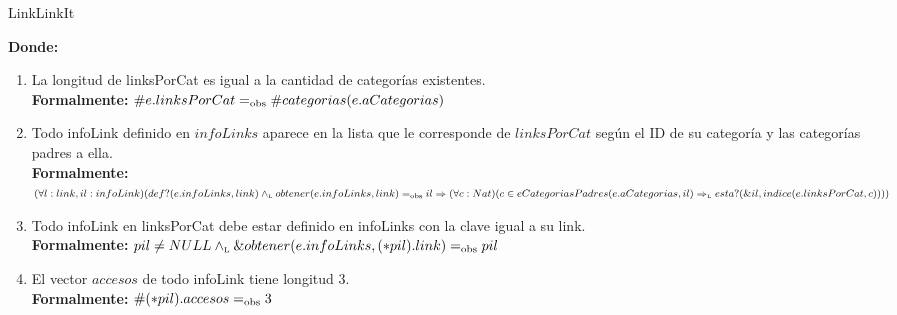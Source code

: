 \documentclass[10pt, a4paper]{article}
\begin{document}
\begin{Estructura}{LinkLinkIt}
    \begin{Tupla}
    \end{Tupla}

	\begin{Tupla}[infoLink]
	\end{Tupla}
\end{Estructura}

\mbox{}

{\bf Donde:}

\begin{enumerate}
  \item La longitud de linksPorCat es igual a la cantidad de categor\'ias existentes.\\
		{\bf Formalmente:} $\#e.linksPorCat =_{\mathrm{obs}} \#categorias(e.aCategorias)$

  \item Todo infoLink definido en $infoLinks$ aparece en la lista que le corresponde de $linksPorCat$ seg\'un el ID de su categor\'ia y las categor\'ias padres a ella.\\
		{\bf Formalmente:} $(\forall l:link, il:infoLink)(def?(e.infoLinks, link) \land_{\mathrm{\scriptscriptstyle{L}}} obtener(e.infoLinks, link) =_{\mathrm{obs}} il \Rightarrow (\forall c:Nat)(c \in eCategoriasPadres(e.aCategorias, il) \Rightarrow_{\mathrm{\scriptscriptstyle{L}}} esta?(\&il, indice(e.linksPorCat, c))))$

  \item Todo infoLink en linksPorCat debe estar definido en infoLinks con la clave igual a su link.\\
		{\bf Formalmente:} $pil \neq NULL \land_{\mathrm{\scriptscriptstyle{L}}} \&obtener(e.infoLinks, (*pil).link) =_{\mathrm{obs}} pil$

  \item El vector $accesos$ de todo infoLink tiene longitud 3.\\
		{\bf Formalmente:} $\#(*pil).accesos =_{\mathrm{obs}} 3$
\end{enumerate}
\end{document}
